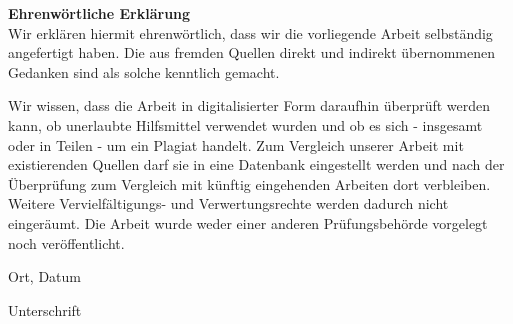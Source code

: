 \cleardoublepage
{}
\thispagestyle{empty}
\textbf{Ehrenwörtliche Erklärung}\\

Wir erklären hiermit ehrenwörtlich, dass wir die vorliegende Arbeit selbständig angefertigt haben. Die aus fremden Quellen direkt und indirekt übernommenen Gedanken sind als solche kenntlich gemacht.

Wir wissen, dass die Arbeit in digitalisierter Form daraufhin überprüft werden kann, ob unerlaubte Hilfsmittel verwendet wurden und ob es sich - insgesamt oder in Teilen - um ein Plagiat handelt. Zum Vergleich unserer Arbeit mit existierenden Quellen darf sie in eine Datenbank eingestellt werden und nach der Überprüfung zum Vergleich mit künftig eingehenden Arbeiten dort verbleiben. Weitere Verviel\-fältigungs- und Verwertungsrechte werden dadurch nicht eingeräumt. Die Arbeit wurde weder einer anderen Prüfungsbehörde vorgelegt noch veröffentlicht.


\vspace{2cm}
Ort, Datum
\vspace{2cm}

Unterschrift

